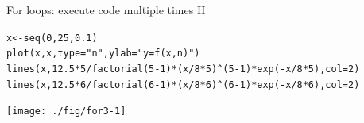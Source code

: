 \documentclass[xcolor=table,           xcolor=dvipsnames]{beamer}\usepackage[]{graphicx}\usepackage[]{color}
\makeatletter
\newcommand{\hlnum}[1]{\textcolor[rgb]{0,0,0}{#1}}
\newcommand{\hlstr}[1]{\textcolor[rgb]{0.545,0.137,0.137}{#1}}
\newcommand{\hlopt}[1]{\textcolor[rgb]{0,0,0}{#1}}
\newcommand{\hlstd}[1]{\textcolor[rgb]{0,0,0}{#1}}
\newcommand{\hlkwb}[1]{\textcolor[rgb]{0,0,0}{#1}}
\newcommand{\hlkwc}[1]{\textcolor[rgb]{1,0,1}{#1}}
\newcommand{\hlkwd}[1]{\textcolor[rgb]{0,0,1}{#1}}
\newenvironment{kframe}{%
 \def\at@end@of@kframe{}%
 \ifinner\ifhmode%
  \def\at@end@of@kframe{\end{minipage}}%
  \begin{minipage}{\columnwidth}%
 \fi\fi%
 \def\FrameCommand##1{\hskip\@totalleftmargin \hskip-\fboxsep
 \colorbox{shadecolor}{##1}\hskip-\fboxsep
     \hskip-\linewidth \hskip-\@totalleftmargin \hskip\columnwidth}%
 \MakeFramed {\advance\hsize-\width
   \@totalleftmargin\z@ \linewidth\hsize
   \@setminipage}}%
 {\par\unskip\endMakeFramed%
 \at@end@of@kframe}
\newenvironment{knitrout}{}{} %
\makeatother
\begin{document}
\begin{frame}[fragile]{For loops: execute code multiple times II}
\begin{knitrout}\footnotesize
{}\color{fgcolor}\begin{kframe}
\begin{alltt}
\hlstd{x} \hlkwb{<-} \hlkwd{seq}\hlstd{(}\hlnum{0}\hlstd{,}\hlnum{25}\hlstd{,}\hlnum{0.1}\hlstd{)}
\hlkwd{plot}\hlstd{(x,x,} \hlkwc{type}\hlstd{=}\hlstr{"n"}\hlstd{,} \hlkwc{ylab}\hlstd{=}\hlstr{"y = f(x,n)"}\hlstd{)}
\hlkwd{lines}\hlstd{(x,} \hlnum{12.5}\hlopt{*}\hlnum{5}\hlopt{/}\hlkwd{factorial}\hlstd{(}\hlnum{5}\hlopt{-}\hlnum{1}\hlstd{)}\hlopt{*}\hlstd{(x}\hlopt{/}\hlnum{8}\hlopt{*}\hlnum{5}\hlstd{)}\hlopt{^}\hlstd{(}\hlnum{5}\hlopt{-}\hlnum{1}\hlstd{)}\hlopt{*}\hlkwd{exp}\hlstd{(}\hlopt{-}\hlstd{x}\hlopt{/}\hlnum{8}\hlopt{*}\hlnum{5}\hlstd{),} \hlkwc{col}\hlstd{=}\hlnum{2}\hlstd{)}
\hlkwd{lines}\hlstd{(x,} \hlnum{12.5}\hlopt{*}\hlnum{6}\hlopt{/}\hlkwd{factorial}\hlstd{(}\hlnum{6}\hlopt{-}\hlnum{1}\hlstd{)}\hlopt{*}\hlstd{(x}\hlopt{/}\hlnum{8}\hlopt{*}\hlnum{6}\hlstd{)}\hlopt{^}\hlstd{(}\hlnum{6}\hlopt{-}\hlnum{1}\hlstd{)}\hlopt{*}\hlkwd{exp}\hlstd{(}\hlopt{-}\hlstd{x}\hlopt{/}\hlnum{8}\hlopt{*}\hlnum{6}\hlstd{),} \hlkwc{col}\hlstd{=}\hlnum{2}\hlstd{)}
\end{alltt}
\end{kframe}

{\centering \texttt{[image: ./fig/for3-1]} 

}



\end{knitrout}
\end{frame}
\end{document}
